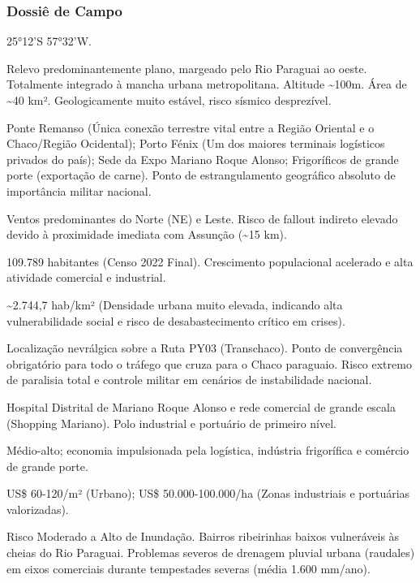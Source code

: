 \subsubsection{Dossiê de Campo}
\begin{description}[style=nextline,leftmargin=0.5cm,font=\bfseries]
\item[Coordenadas]  25°12'S 57°32'W.
\item[Topografia]  Relevo predominantemente plano, margeado pelo Rio Paraguai ao oeste. Totalmente integrado à mancha urbana metropolitana. Altitude \textasciitilde 100m. Área de \textasciitilde 40 km². Geologicamente muito estável, risco sísmico desprezível.
\item[Alvos Estratégicos]  Ponte Remanso (Única conexão terrestre vital entre a Região Oriental e o Chaco/\allowbreak Região Ocidental); Porto Fénix (Um dos maiores terminais logísticos privados do país); Sede da Expo Mariano Roque Alonso; Frigoríficos de grande porte (exportação de carne). Ponto de estrangulamento geográfico absoluto de importância militar nacional.
\item[Fallout]  Ventos predominantes do Norte (NE) e Leste. Risco de fallout indireto elevado devido à proximidade imediata com Assunção (\textasciitilde 15 km).
\item[População]  109.789 habitantes (Censo 2022 Final). Crescimento populacional acelerado e alta atividade comercial e industrial.
\item[Densidade]  \textasciitilde 2.744,7 hab/\allowbreak km² (Densidade urbana muito elevada, indicando alta vulnerabilidade social e risco de desabastecimento crítico em crises).
\item[Vias de Acesso]  Localização nevrálgica sobre a Ruta PY03 (Transchaco). Ponto de convergência obrigatório para todo o tráfego que cruza para o Chaco paraguaio. Risco extremo de paralisia total e controle militar em cenários de instabilidade nacional.
\item[Serviços]  Hospital Distrital de Mariano Roque Alonso e rede comercial de grande escala (Shopping Mariano). Polo industrial e portuário de primeiro nível.
\item[Custo de Vida]  Médio-alto; economia impulsionada pela logística, indústria frigorífica e comércio de grande porte.
\item[Preço da Terra]  US\$ 60-120/\allowbreak m² (Urbano); US\$ 50.000-100.000/\allowbreak ha (Zonas industriais e portuárias valorizadas).
\item[Hidrologia]  Risco Moderado a Alto de Inundação. Bairros ribeirinhas baixos vulneráveis às cheias do Rio Paraguai. Problemas severos de drenagem pluvial urbana (raudales) em eixos comerciais durante tempestades severas (média 1.600 mm/\allowbreak ano).

\end{description}
